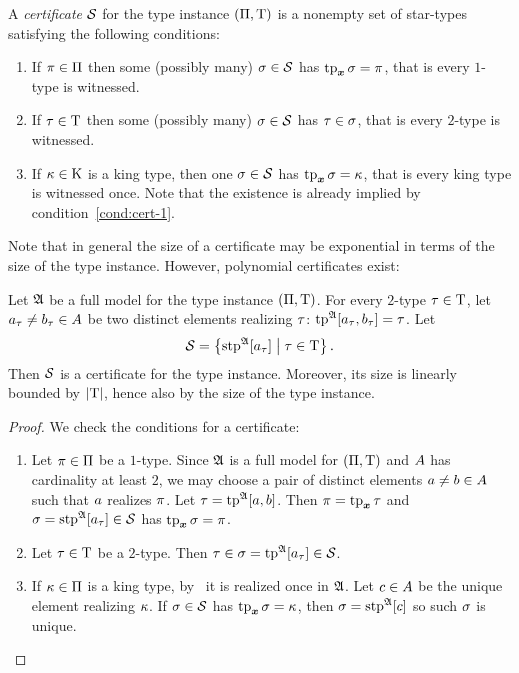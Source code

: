 \begin{definition}
A \emph{certificate} $\mathcal{S}$ for the type instance $(\Pi,\mathrm{T})$ is a
nonempty set of star-types satisfying the following conditions:
\begin{enumerate}
  \item\label{cond:cert-1} If $\pi \in \Pi$ then some (possibly many) $\sigma
  \in \mathcal{S}$ has $\operatorname{tp}_{\bm{x}}\sigma = \pi$, that is every $1$-type is witnessed.
  \item\label{cond:cert-2} If $\tau \in \mathrm{T}$ then some (possibly many)
  $\sigma\in\mathcal{S}$ has $\tau \in \sigma$, that is every $2$-type is witnessed.
  \item\label{cond:cert-3} If $\kappa \in \mathrm{K}$ is a king type, then one $\sigma
  \in \mathcal{S}$ has $\operatorname{tp}_{\bm{x}}\sigma = \kappa$, that is every king type is witnessed once.
  Note that the existence is already implied by condition~\ref{cond:cert-1}.
\end{enumerate}
\end{definition}
Note that in general the size of a certificate may be exponential in terms of
the size of the type instance. However, polynomial certificates exist:
\begin{lemma}\label{lem:cert-extract}
Let $\mathfrak{A}$ be a full model for the type instance $(\Pi,\mathrm{T})$.
For every $2$-type $\tau \in \mathrm{T}$,
let $a_\tau \neq b_\tau \in A$ be two distinct elements realizing
$\tau$: $\operatorname{tp}^{\mathfrak{A}}[a_\tau,b_\tau] = \tau$.
Let 
\[
  \mathcal{S} = \left\{\operatorname{stp}^{\mathfrak{A}}[a_\tau]\mathrel{}\middle|\mathrel{}\tau\in\mathrm{T}\right\}.
\]
Then $\mathcal{S}$ is a certificate for the type instance. Moreover, its size is
linearly bounded by $\left|\mathrm{T}\right|$, hence also by the size of the type instance.
\end{lemma}
\begin{proof}
We check the conditions for a certificate:
\begin{enumerate}
  \item Let $\pi \in \Pi$ be a $1$-type. Since $\mathfrak{A}$ is a full
  model for $(\Pi,\mathrm{T})$ and $A$ has cardinality at least $2$, we may
  choose a pair of distinct elements $a\neq b\in A$ such that $a$
  realizes $\pi$. Let $\tau = \operatorname{tp}^{\mathfrak{A}}[a,b]$.
  Then $\pi = \operatorname{tp}_{\bm{x}}\tau$ and $\sigma = \operatorname{stp}^{\mathfrak{A}}[a_\tau] \in \mathcal{S}$ has
  $\operatorname{tp}_{\bm{x}}\sigma = \pi$.
  \item Let $\tau \in \mathrm{T}$ be a $2$-type. Then
  $\tau \in \sigma = \operatorname{tp}^{\mathfrak{A}}[a_\tau] \in \mathcal{S}$.
  \item If $\kappa \in \Pi$ is a king type, by~ it
  is realized once in $\mathfrak{A}$.
  Let $c \in A$ be the unique element realizing $\kappa$.
  If $\sigma \in \mathcal{S}$ has $\operatorname{tp}_{\bm{x}}\sigma = \kappa$, then $\sigma = \operatorname{stp}^{\mathfrak{A}}[c]$
  so such $\sigma$ is unique.
\end{enumerate}
\end{proof}

